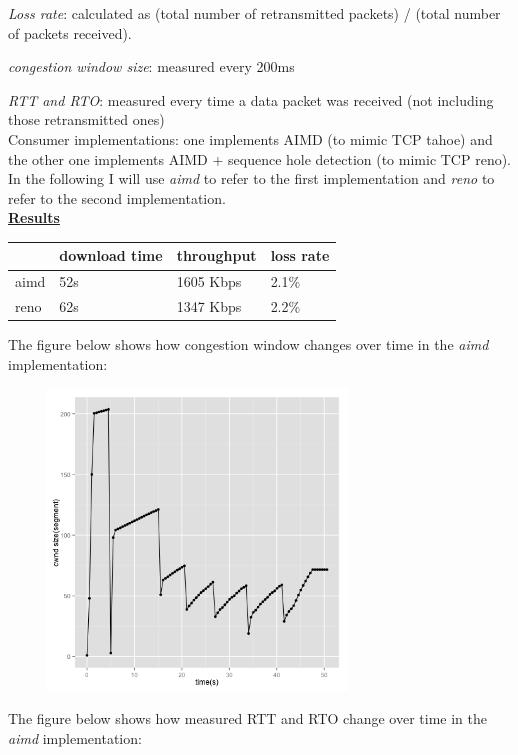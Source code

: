 \documentclass[10pt]{article}
\begin{document}
\emph{Loss rate}: calculated as (total number of retransmitted packets) /
(total number of packets received).

\emph{congestion window size}: measured every 200ms

\emph{RTT and RTO}: measured every time a data packet was received (not
including those retransmitted ones)\\

Consumer implementations: one implements AIMD (to mimic TCP tahoe) and
the other one implements AIMD + sequence hole detection (to mimic TCP
reno). In the following I will use \emph{aimd} to refer to the first
implementation and \emph{reno} to refer to the second implementation.\\

\underline{\textbf{Results}}\\

\begin{tabular}{ | l | l | l | l |}
  \hline
  & download time & throughput & loss rate \\\hline
  aimd & 52s & 1605 Kbps & 2.1\% \\\hline
  reno & 62s & 1347 Kbps & 2.2\% \\\hline
\end{tabular}

\vspace{1em}

The figure below shows how congestion window changes over time in the
\emph{aimd} implementation:

\begin{center}
  \includegraphics[width=10cm,height=8cm]{./cwnd_aimd.png}
\end{center}

The figure below shows how measured RTT and RTO change over time in
the \emph{aimd} implementation:
\end{document}
